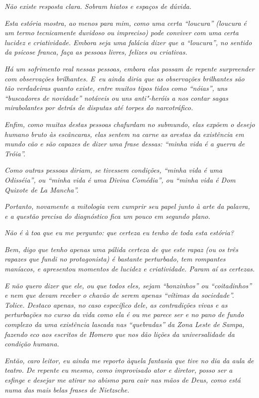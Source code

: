 \emph{Não existe resposta clara. Sobram hiatos e espaços de dúvida.}~

\emph{Esta estória mostra, ao menos para mim, como uma certa ``loucura''
(loucura é um termo tecnicamente duvidoso ou impreciso) pode conviver
com uma certa lucidez e criatividade. Embora seja uma falácia dizer que
a ``loucura'', no sentido da psicose franca, faça as pessoas livres,
felizes ou criativas.}~

\emph{Há um sofrimento real nessas pessoas, embora elas possam de
repente surpreender com observações brilhantes. E~eu ainda diria que as
observações brilhantes são tão verdadeiras quanto existe, entre muitos
tipos tidos como ``nóias'', uns ``buscadores de novidade'' notáveis ou
uns anti"-heróis a nos contar sagas mirabolantes por detrás de disputas
até torpes do narcotráfico.}~

\emph{Enfim, como muitas destas pessoas chafurdam no submundo, elas
expõem o desejo humano bruto às escâncaras, elas sentem na carne as
arestas da existência em mundo cão e são capazes de dizer uma frase
dessas: ``minha vida é a guerra de Tróia''.}~

\emph{Como outras pessoas diriam, se tivessem condições, ``minha vida é
uma Odisséia'', ou ``minha vida é uma Divina Comédia'', ou ``minha vida
é Dom Quixote de La Mancha''.}~

\emph{Portanto, novamente a mitologia vem cumprir seu papel junto à arte
da palavra, e a questão precisa do diagnóstico fica um pouco em segundo
plano.}~

\emph{Não é à toa que eu me pergunto: que certeza eu tenho de toda esta
estória?}~

\emph{Bem, digo que tenho apenas uma pálida certeza de que este rapaz
(ou os três rapazes que fundi no protagonista) é bastante perturbado,
tem rompantes maníacos, e apresentou momentos de lucidez e criatividade.
Param aí as certezas.}

\emph{E não quero dizer que ele, ou que todos eles, sejam ``bonzinhos''
ou ``coitadinhos'' e nem que devam receber o chavão de serem apenas
``vítimas da sociedade''. Tolice. Destaco apenas, no caso específico
dele, as contradições vivas e as perturbações no curso da vida como ela
é ou me parece ser e no pano de fundo complexo da uma existência lascada
nas ``quebradas'' da Zona Leste de Sampa, fazendo eco aos escritos de
Homero que nos dão lições da universalidade da condição humana.}~

\emph{Então, caro leitor, eu ainda me reporto àquela fantasia que tive
no dia da aula de teatro. De repente eu mesmo, como improvisado ator e
diretor, posso ser a esfinge e desejar me atirar no abismo para cair nas
mãos de Deus, como está numa das mais belas frases de Nietzsche.}~

